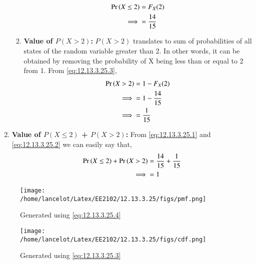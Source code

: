 \documentclass[journal,12pt,twocolumn]{IEEEtran}
\theoremstyle{remark}
\begin{document}
\begin{enumerate}
\begin{enumerate}
	\begin{align}
	\Pr\left(X \le 2\right) &= F_{X}(2)\\
	\implies&= \frac{14}{15} \label{eq:12.13.3.25.1}
	\end{align}
	\item \textbf{Value of $P(X > 2)$:} $P(X > 2)$ translates to sum of probabilities of all states of the random variable greater than 2. In other words, it can be obtained by removing the probability of X being less than or equal to 2 from 1. From \eqref{eq:12.13.3.25.3},
	\begin{align}
	\Pr\left(X > 2\right) &= 1 - F_{X}(2)\\
	\implies &= 1 - \frac{14}{15} \\
	\implies &= \frac{1}{15}  \label{eq:12.13.3.25.2}
	\end{align}
	\end{enumerate}
\item \textbf{Value of $P(X \le 2)$ + $P(X > 2)$:} From \eqref{eq:12.13.3.25.1} and \eqref{eq:12.13.3.25.2} we can easily say that,
\begin{align}
	\Pr\left(X \le 2\right) + \Pr\left(X > 2\right) &= \frac{14}{15} + \frac{1}{15}\\
	\implies &= 1
\end{align}
\end{enumerate}
\begin{figure}
	\centering
	\texttt{[image: /home/lancelot/Latex/EE2102/12.13.3.25/figs/pmf.png]}
	\caption{Generated using \eqref{eq:12.13.3.25.4}}
	\label{fig:PMF of X}
\end{figure}
\begin{figure}
	\centering
	\texttt{[image: /home/lancelot/Latex/EE2102/12.13.3.25/figs/cdf.png]}
	\caption{Generated using \eqref{eq:12.13.3.25.3}}
	\label{fig:CDF of X}
\end{figure}
\end{document}
